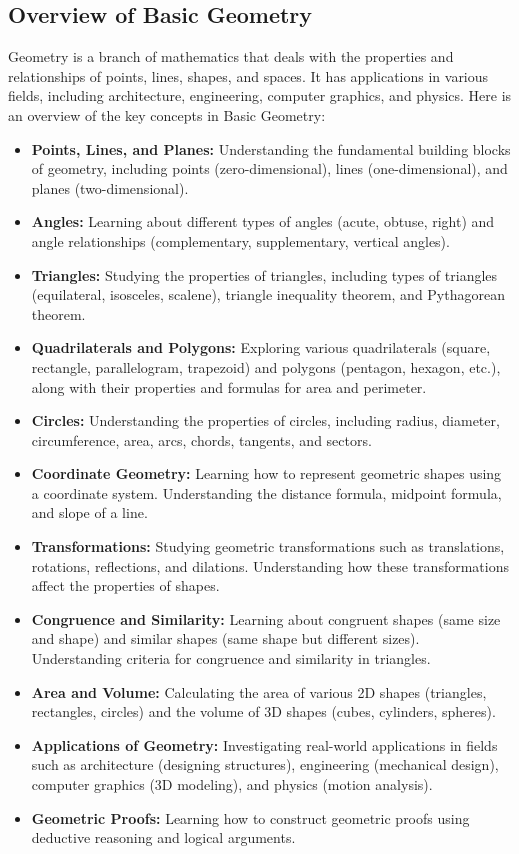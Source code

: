 \documentclass[openany]{book}
\begin{document}
\subsection{Overview of Basic Geometry}
Geometry is a branch of mathematics that deals with the properties and relationships of points, lines, shapes, and spaces. It has applications in various fields, including architecture, engineering, computer graphics, and physics. Here is an overview of the key concepts in Basic Geometry:
\begin{itemize}
    \item \textbf{Points, Lines, and Planes:} Understanding the fundamental building blocks of geometry, including points (zero-dimensional), lines (one-dimensional), and planes (two-dimensional).
    \item \textbf{Angles:} Learning about different types of angles (acute, obtuse, right) and angle relationships (complementary, supplementary, vertical angles).
    \item \textbf{Triangles:} Studying the properties of triangles, including types of triangles (equilateral, isosceles, scalene), triangle inequality theorem, and Pythagorean theorem.
    \item \textbf{Quadrilaterals and Polygons:} Exploring various quadrilaterals (square, rectangle, parallelogram, trapezoid) and polygons (pentagon, hexagon, etc.), along with their properties and formulas for area and perimeter.
    \item \textbf{Circles:} Understanding the properties of circles, including radius, diameter, circumference, area, arcs, chords, tangents, and sectors.
    \item \textbf{Coordinate Geometry:} Learning how to represent geometric shapes using a coordinate system. Understanding the distance formula, midpoint formula, and slope of a line.
    \item \textbf{Transformations:} Studying geometric transformations such as translations, rotations, reflections, and dilations. Understanding how these transformations affect the properties of shapes.
    \item \textbf{Congruence and Similarity:} Learning about congruent shapes (same size and shape) and similar shapes (same shape but different sizes). Understanding criteria for congruence and similarity in triangles.
    \item \textbf{Area and Volume:} Calculating the area of various 2D shapes (triangles, rectangles, circles) and the volume of 3D shapes (cubes, cylinders, spheres).
    \item \textbf{Applications of Geometry:} Investigating real-world applications in fields such as architecture (designing structures), engineering (mechanical design), computer graphics (3D modeling), and physics (motion analysis).
    \item \textbf{Geometric Proofs:} Learning how to construct geometric proofs using deductive reasoning and logical arguments.
\end{itemize}
\end{document}
